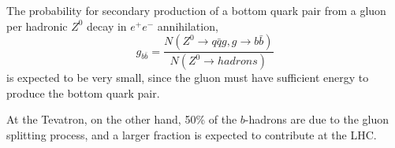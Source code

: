  The probability for secondary production of a bottom quark pair from a gluon per hadronic $Z^0$ decay in $e^+e^-$ annihilation, 
\begin{equation} 
g_{b\bar{b}} = \frac{N(Z^0 \rightarrow q\bar{q}g, g \rightarrow b\bar{b} )}{N(Z^0 \rightarrow hadrons)}
\end{equation} 
is expected to be very small, since the gluon must have sufficient energy to produce the bottom quark pair. 

 At the Tevatron, on the other hand, 50\% of the $b$-hadrons are due to the gluon splitting process, and a larger fraction is expected to contribute at the LHC.
